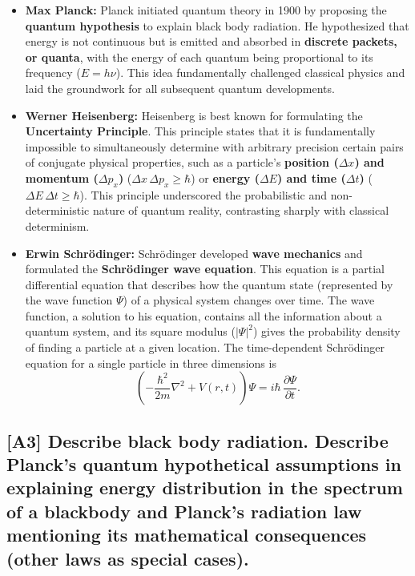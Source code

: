 \documentclass[12pt]{article}
\begin{document}
\begin{itemize}
    \item \textbf{Max Planck:} Planck initiated quantum theory in 1900 by proposing the \textbf{quantum hypothesis} to explain black body radiation. He hypothesized that energy is not continuous but is emitted and absorbed in \textbf{discrete packets, or quanta}, with the energy of each quantum being proportional to its frequency ($E=h\nu$). This idea fundamentally challenged classical physics and laid the groundwork for all subsequent quantum developments.
    \item \textbf{Werner Heisenberg:} Heisenberg is best known for formulating the \textbf{Uncertainty Principle}. This principle states that it is fundamentally impossible to simultaneously determine with arbitrary precision certain pairs of conjugate physical properties, such as a particle's \textbf{position ($\Delta x$) and momentum ($\Delta p_x$)} ($\Delta x\,\Delta p_x \ge \hbar$) or \textbf{energy ($\Delta E$) and time ($\Delta t$)} ($\Delta E\,\Delta t \ge \hbar$). This principle underscored the probabilistic and non-deterministic nature of quantum reality, contrasting sharply with classical determinism.
    \item \textbf{Erwin Schrödinger:} Schrödinger developed \textbf{wave mechanics} and formulated the \textbf{Schrödinger wave equation}. This equation is a partial differential equation that describes how the quantum state (represented by the wave function $\Psi$) of a physical system changes over time. The wave function, a solution to his equation, contains all the information about a quantum system, and its square modulus ($|\Psi|^2$) gives the probability density of finding a particle at a given location. The time-dependent Schrödinger equation for a single particle in three dimensions is
    \[
      \left(-\frac{\hbar^2}{2m}\nabla^2 + V(r,t)\right)\Psi = i\hbar\,\frac{\partial\Psi}{\partial t}.
    \]
\end{itemize}

\subsection{[A3] Describe black body radiation. Describe Planck's quantum hypothetical assumptions in explaining energy distribution in the spectrum of a blackbody and Planck's radiation law mentioning its mathematical consequences (other laws as special cases).}
\end{document}
